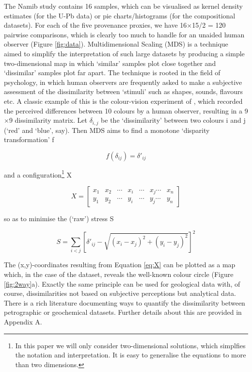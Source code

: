 \documentclass{article}
\begin{document}
The Namib study contains 16 samples, which can be visualised as kernel
density estimates (for the U-Pb data) or pie charts/histograms (for
the compositional datasets). For each of the five provenance proxies,
we have 16$\times$15/2 = 120 pairwise comparisons, which is clearly
too much to handle for an unaided human observer (Figure
\ref{fig:data}).  Multidimensional Scaling (MDS) is a technique aimed
to simplify the interpretation of such large datasets by producing a
simple two-dimensional map in which `similar' samples plot close
together and `dissimilar' samples plot far apart. The technique is
rooted in the field of psychology, in which human observers are
frequently asked to make a subjective assessment of the dissimilarity
between `stimuli' such as shapes, sounds, flavours etc. A classic
example of this is the colour-vision experiment of \citet{helm1964},
which recorded the perceived differences between 10 colours by a human
observer, resulting in a 9$\times$9 dissimilarity matrix. Let
$\delta_{i,j}$ be the `dissimilarity' between two colours i and j
(`red' and `blue', say). Then MDS aims to find a monotone `disparity
transformation' f

\begin{equation}
f(\delta_{ij}) = \delta'_{ij}
\label{eq:f}
\end{equation}

and a configuration\footnote{In this paper we will only consider
  two-dimensional solutions, which simplfies the notation and
  interpretation. It is easy to generalise the equations to more than
  two dimensions.} X

\begin{equation}
X = \left[
\begin{array}{cccccccc}
x_1 & x_2 & \cdots & x_i & \cdots & x_j \cdots & x_n\\
y_1 & y_2 & \cdots & y_i & \cdots & y_j \cdots & y_n
\end{array}
\right]
\label{eq:X}
\end{equation}

so as to minimise the (`raw') stress S

\begin{equation}
S = \sum\limits_{i<j} \left[\delta'_{ij} - \sqrt{(x_i-x_j)^2+(y_i-y_j)^2}\right]^2
\label{eq:stress}
\end{equation}

The (x,y)-coordinates resulting from Equation \ref{eq:X} can be
plotted as a map which, in the case of the \citet{helm1964} dataset,
reveals the well-known colour circle (Figure \ref{fig:2way}a). Exactly
the same principle can be used for geological data with, of course,
dissimilarities not based on subjective perceptions but analytical
data.  There is a rich literature documenting ways to quantify the
dissimilarity between petrographic or geochemical datasets. Further
details about this are provided in Appendix A.\\
\end{document}
